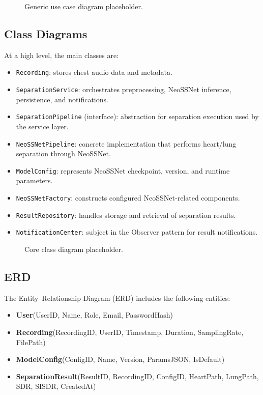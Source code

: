 \documentclass[12pt,a4paper]{report}
\begin{document}
\begin{figure}[h]
  \centering
  \caption{Generic use case diagram placeholder.}
\end{figure}

\subsection{Class Diagrams}
At a high level, the main classes are:
\begin{itemize}[nosep]
  \item \texttt{Recording}: stores chest audio data and metadata.
  \item \texttt{SeparationService}: orchestrates preprocessing, NeoSSNet inference, persistence, and notifications.
  \item \texttt{SeparationPipeline} (interface): abstraction for separation execution used by the service layer.
  \item \texttt{NeoSSNetPipeline}: concrete implementation that performs heart/lung separation through NeoSSNet.
  \item \texttt{ModelConfig}: represents NeoSSNet checkpoint, version, and runtime parameters.
  \item \texttt{NeoSSNetFactory}: constructs configured NeoSSNet-related components.
  \item \texttt{ResultRepository}: handles storage and retrieval of separation results.
  \item \texttt{NotificationCenter}: subject in the Observer pattern for result notifications.
\end{itemize}

\begin{figure}[h]
  \centering
  \caption{Core class diagram placeholder.}
\end{figure}

\subsection{ERD}
The Entity--Relationship Diagram (ERD) includes the following entities:
\begin{itemize}[nosep]
  \item \textbf{User}(UserID, Name, Role, Email, PasswordHash)
  \item \textbf{Recording}(RecordingID, UserID, Timestamp, Duration, SamplingRate, FilePath)
  \item \textbf{ModelConfig}(ConfigID, Name, Version, ParamsJSON, IsDefault)
  \item \textbf{SeparationResult}(ResultID, RecordingID, ConfigID, HeartPath, LungPath, SDR, SISDR, CreatedAt)
\end{itemize}
\end{document}
